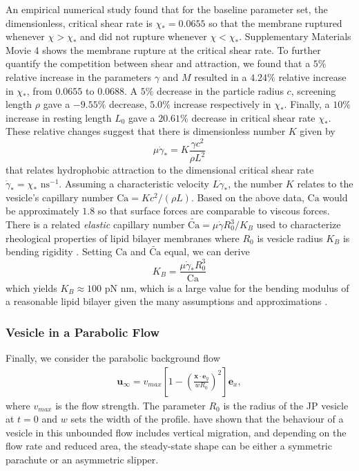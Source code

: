 \documentclass[lineno]{jfm}
\newcommand{\xx}{\mathbf{x}}
\newcommand{\uu}{\mathbf{u}}
\begin{document}
An empirical numerical study found that for the baseline
parameter set, the dimensionless, critical shear rate is $\chi_*=0.0655$
so that the membrane ruptured whenever $\chi > \chi_*$ and did not
rupture whenever $\chi < \chi_*.$ Supplementary Materials Movie 4 shows
the membrane rupture at the critical shear rate.  To further quantify
the competition between shear and attraction, we found that a $5 \%$
relative increase in the parameters $\gamma$ and $M$ resulted in a $4.24
\%$ relative increase in $\chi_*$, from $0.0655$ to $0.0688$.  A $5 \%$
decrease in the particle radius $c$, screening length $\rho$ gave a
$-9.55 \%$ decrease, $5.0 \%$ increase respectively in $\chi_*$.
Finally, a $10 \%$ increase in resting length $L_0$ gave a $20.61 \%$
decrease in critical shear rate $\chi_*$.  
These relative changes suggest that there is dimensionless number $K$ given by 
  \begin{equation}
    \label{eq:CSR}
  \mu \dot\gamma_* = K \frac{\gamma c^2}{\rho L^2}
  \end{equation}
  that relates hydrophobic attraction to the dimensional critical shear rate $\dot \gamma_* = \chi_* \text{ ns}^{-1}$.
  Assuming a characteristic velocity $L\dot \gamma_*$, the number $K$ relates to the vesicle's capillary number
  $\text{Ca} = K c^2/(\rho L)$. Based on the above data, $\text{Ca}$ would be approximately $1.8$
  so that surface forces are comparable to viscous forces.  
  There is a related \emph{elastic} capillary number
  $\widetilde{\text{Ca}} = \mu \dot{\gamma} R_0^3/K_B$
  used to characterize rheological properties of lipid bilayer membranes
  where $R_0$ is vesicle radius $K_B$ is bending rigidity \citep{VLAHOVSKA2009775, keller_skalak_1982}. 
  Setting $\text{Ca}$ and $\widetilde{\text{Ca}}$ equal, we can derive
  \[
  K_B = \frac{\mu \dot \gamma_* R_0^3}{\text{Ca}}
  \]
  which yields $K_B \approx 100$ pN $\text{nm}$, which is a large
  value for the bending modulus of a reasonable lipid bilayer given the many assumptions and approximations \citep{NaTr00}.



\subsubsection{Vesicle in a Parabolic Flow}
\label{sec:ves_in_parabolic}
Finally, we consider the parabolic background flow
\begin{align}
  \uu_\infty = v_{max}\left[ 1 - \left( 
    \frac{\xx \cdot \mathbf{e}_y}{wR_0}\right)^2
    \right]\mathbf{e}_x,
\end{align}
%
where $v_{max}$ is the flow strength. 
The parameter $R_0$ is the radius of the JP vesicle at $t=0$ and
$w$ sets the width of the profile. \cite{Kaoui09, cou-kao-pod-mis2008,
dan-vla-mis2009} have shown that the behaviour of a vesicle in this
unbounded flow includes vertical migration, and depending on the flow
rate and reduced area, the steady-state shape can be either a symmetric
parachute or an asymmetric slipper.
\end{document}
